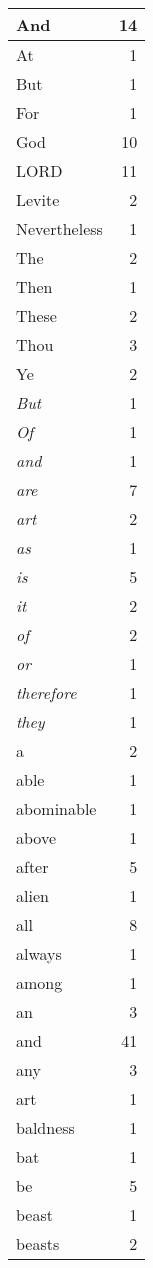 \begin{center}
\begin{longtable}{l|r}
\hline \hline
\endlastfoot
And & 14 \\ \hline
At & 1 \\ \hline
But & 1 \\ \hline
For & 1 \\ \hline
God & 10 \\ \hline
LORD & 11 \\ \hline
Levite & 2 \\ \hline
Nevertheless & 1 \\ \hline
The & 2 \\ \hline
Then & 1 \\ \hline
These & 2 \\ \hline
Thou & 3 \\ \hline
Ye & 2 \\ \hline
\emph{But} & 1 \\ \hline
\emph{Of} & 1 \\ \hline
\emph{and} & 1 \\ \hline
\emph{are} & 7 \\ \hline
\emph{art} & 2 \\ \hline
\emph{as} & 1 \\ \hline
\emph{is} & 5 \\ \hline
\emph{it} & 2 \\ \hline
\emph{of} & 2 \\ \hline
\emph{or} & 1 \\ \hline
\emph{therefore} & 1 \\ \hline
\emph{they} & 1 \\ \hline
a & 2 \\ \hline
able & 1 \\ \hline
abominable & 1 \\ \hline
above & 1 \\ \hline
after & 5 \\ \hline
alien & 1 \\ \hline
all & 8 \\ \hline
always & 1 \\ \hline
among & 1 \\ \hline
an & 3 \\ \hline
and & 41 \\ \hline
any & 3 \\ \hline
art & 1 \\ \hline
baldness & 1 \\ \hline
bat & 1 \\ \hline
be & 5 \\ \hline
beast & 1 \\ \hline
beasts & 2 \\ \hline

\end{longtable}
\end{center}
